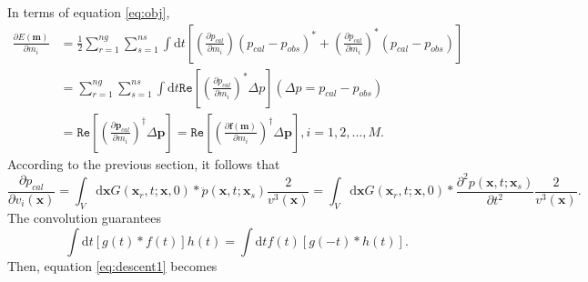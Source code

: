 In terms of equation \eqref{eq:obj},
\begin{equation}\label{eq:descent1}
\begin{split}
\frac{\partial E(\textbf{m})}{\partial m_i}
&=\frac{1}{2}\sum_{r=1}^{ng}\sum_{s=1}^{ns}\int \mathrm{d}t\left[\left(\frac{\partial p_{cal}}{\partial m_i}\right)(p_{cal}-p_{obs})^*+
\left(\frac{\partial p_{cal}}{\partial m_i}\right)^*(p_{cal}-p_{obs})\right]\\
&=\sum_{r=1}^{ng}\sum_{s=1}^{ns}\int \mathrm{d}t\mathtt{Re} \left[\left(\frac{\partial p_{cal}}{\partial m_i}\right)^*\Delta p\right] (\Delta p=p_{cal}-p_{obs})\\
&=\mathtt{Re}\left[\left(\frac{\partial \textbf{p}_{cal}}{\partial m_i}\right)^{\dagger}\Delta \textbf{p}\right]
=\mathtt{Re}\left[\left(\frac{\partial \textbf{f}(\textbf{m})}{\partial m_i}\right)^{\dagger}\Delta \textbf{p}\right], 
i=1,2,\ldots,M.
\end{split}
\end{equation}
According to the previous section, it follows that
\begin{equation}
\frac{\partial p_{cal}}{\partial v_i(\textbf{x})}
=\int_V \mathrm{d}\textbf{x} G(\textbf{x}_r,t;\textbf{x},0)*
\ddot{p}(\textbf{x},t;\textbf{x}_s)\frac{2}{v^3(\textbf{x})}
=\int_V \mathrm{d}\textbf{x} G(\textbf{x}_r,t;\textbf{x},0)*
\frac{\partial^2 p(\textbf{x},t;\textbf{x}_s)}{\partial t^2}\frac{2}{v^3(\textbf{x})}.
\end{equation}
The convolution guarantees
\begin{equation}
\int \mathrm{d}t [g(t)*f(t)]h(t)=\int \mathrm{d}t f(t)[g(-t)*h(t)].
\end{equation}
Then, equation \eqref{eq:descent1} becomes
